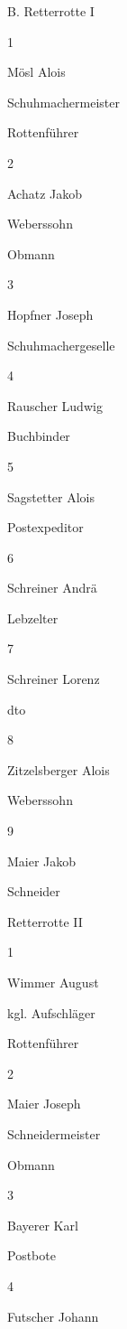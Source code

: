 \documentclass[12pt,a4pager]{book}
\begin{document}
B. Retterrotte I

1

Mösl Alois

Schuhmachermeister

Rottenführer

2

Achatz Jakob

Weberssohn

Obmann

3

Hopfner Joseph

Schuhmachergeselle



4

Rauscher Ludwig

Buchbinder



5

Sagstetter Alois

Postexpeditor



6

Schreiner Andrä

Lebzelter



7

Schreiner Lorenz

dto



8

Zitzelsberger Alois

Weberssohn



9

Maier Jakob

Schneider





Retterrotte II

1

Wimmer August

kgl. Aufschläger

Rottenführer

2

Maier Joseph

Schneidermeister

Obmann

3

Bayerer Karl

Postbote



4

Futscher Johann
\end{document}

